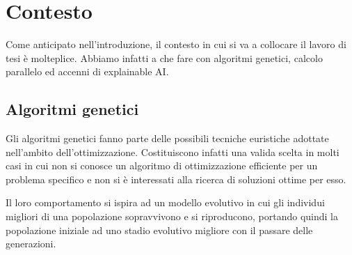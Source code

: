 \chapter{Contesto}

Come anticipato nell'introduzione, il contesto in cui si va a collocare il
lavoro di tesi è molteplice. Abbiamo infatti a che fare con algoritmi genetici,
calcolo parallelo ed accenni di explainable AI.

\section{Algoritmi genetici}

Gli algoritmi genetici fanno parte delle possibili tecniche euristiche adottate
nell'ambito dell'ottimizzazione. Costituiscono infatti una valida scelta in
molti casi in cui non si conosce un algoritmo di ottimizzazione efficiente per
un problema specifico e non si è interessati alla ricerca di soluzioni ottime
per esso.

Il loro comportamento si ispira ad un modello evolutivo in cui gli individui
migliori di una popolazione sopravvivono e si riproducono, portando quindi la
popolazione iniziale ad uno stadio evolutivo migliore con il passare delle
generazioni.

